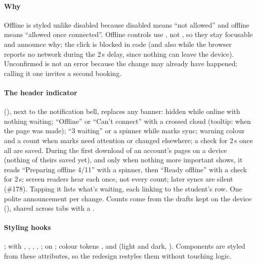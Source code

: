 \paragraph{Why} Offline is styled unlike disabled because disabled means ``not allowed'' and offline
means ``allowed once connected''. Offline controls use , not , so
they stay focusable and announce why; the click is blocked in code (and also while the browser
reports no network during the 2\,s delay, since nothing can leave the device). Unconfirmed is not an
error because the change may already have happened; calling it one invites a second booking.

\paragraph{The header indicator} 
(), next to the notification bell, replaces any banner:
hidden while online with nothing waiting; ``Offline'' or ``Can't connect'' with a crossed cloud
(tooltip: when the page was made); ``3 waiting'' or a spinner while marks sync; warning colour and a
count when marks need attention or changed elsewhere; a check for 2\,s once all are saved. During the first download of an account's pages on a device (nothing of theirs saved yet), and only when nothing more important shows, it reads ``Preparing offline 4/11'' with a spinner, then ``Ready offline'' with a check for 2\,s; screen readers hear each once, not every count; later syncs are silent (\#178). Tapping
it lists what's waiting, each linking to the student's row. One polite announcement per change.
Counts come from the drafts kept on the device (), shared across tabs
with a .

\paragraph{Styling hooks} ;  with
, , , , ;
 on ; colour tokens ,  and
 (light and dark, ). Components are styled from these
attributes, so the redesign restyles them without touching logic.

